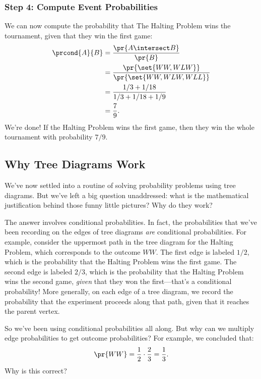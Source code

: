 \subsubsection*{Step 4: Compute Event Probabilities}

We can now compute the probability that The Halting Problem wins the
tournament, given that they win the first game:
%
\begingroup
{}
\begin{align*}
\prcond{A}{B}
    & = \frac{\pr{A \intersect B}}{\pr{B}} \\
    & = \frac{\pr{\set{WW, WLW}}}{\pr{\set{WW, WLW, WLL}}} \\
    & = \frac{1/3 + 1/18}{1/3 + 1/18 + 1/9} \\
    & = \frac{7}{9}.
\end{align*}
\endgroup
%
We're done!  If the Halting Problem wins the first game, then they win
the whole tournament with probability $7 / 9$.


\subsection{Why Tree Diagrams Work}\label{product_rule_subsec}

We've now settled into a routine of solving probability problems using
tree diagrams.  But we've left a big question unaddressed: what is the
mathematical justification behind those funny little pictures?  Why do
they work?

The answer involves conditional probabilities.  In fact, the
probabilities that we've been recording on the edges of tree diagrams
\emph{are} conditional probabilities.  For example, consider the
uppermost path in the tree diagram for the Halting Problem, which
corresponds to the outcome $WW$.  The first edge is labeled $1/2$,
which is the probability that the Halting Problem wins the first game.
The second edge is labeled $2 / 3$, which is the probability that the
Halting Problem wins the second game, \emph{given} that they won the
first---that's a conditional probability!  More generally, on each
edge of a tree diagram, we record the probability that the experiment
proceeds along that path, given that it reaches the parent vertex.

So we've been using conditional probabilities all along.  But why can
we multiply edge probabilities to get outcome probabilities?  For
example, we concluded that:
%
\begin{equation*}
\pr{WW} = \frac{1}{2} \cdot \frac{2}{3}
	= \frac{1}{3}.
\end{equation*}
%
Why is this correct?

